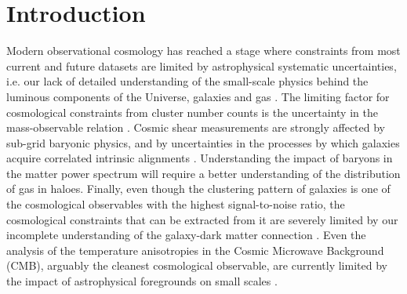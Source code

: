 \documentclass[useAMS,usenatbib]{mn2e}
\begin{document}
\section{Introduction}\label{sec:intro}
  Modern observational cosmology has reached a stage where constraints from most current and future datasets are limited by astrophysical systematic uncertainties, i.e. our lack of detailed understanding of the small-scale physics behind the luminous components of the Universe, galaxies and gas \citep[e.g.][]{2011MNRAS.415.3649V,2011MNRAS.417.2020S,2014JCAP...04..028F,2015MNRAS.454.2451E,2015MNRAS.454.1958M,2015JCAP...12..049S,2019MNRAS.488.1652H,2019JCAP...03..020S,2019OJAp....2E...4C}. The limiting factor for cosmological constraints from cluster number counts is the uncertainty in the mass-observable relation \citep{2009ApJ...692.1060V,2010ApJ...722.1180V,2011ApJ...732...44S,2013JCAP...07..008H,2014MNRAS.440.2077M,2014A&A...571A..20P,2015MNRAS.446.2205M,2016A&A...594A..24P,2016ApJ...832...95D,2019ApJ...878...55B}. Cosmic shear measurements are strongly affected by sub-grid baryonic physics, and by uncertainties in the processes by which galaxies acquire correlated intrinsic alignments \citep[e.g.][]{2001MNRAS.320L...7C,2002MNRAS.332..788M,2004PhRvD..70f3526H,2017MNRAS.465.2033J,2018PhRvD..98d3528T,2018arXiv181206076H,2018ARA&A..56..393M,2018arXiv181106989S}. Understanding the impact of baryons in the matter power spectrum will require a better understanding of the distribution of gas in haloes. Finally, even though the clustering pattern of galaxies is one of the cosmological observables with the highest signal-to-noise ratio, the cosmological constraints that can be extracted from it are severely limited by our incomplete understanding of the galaxy-dark matter connection \citep[see e.g.][and references therein]{2018ARA&A..56..435W}. Even the analysis of the temperature anisotropies in the Cosmic Microwave Background (CMB), arguably the cleanest cosmological observable, are currently limited by the impact of astrophysical foregrounds on small scales \citep{2014ApJ...782...74H,2017JCAP...06..031L,2019arXiv190712875P}.
  
\end{document}
